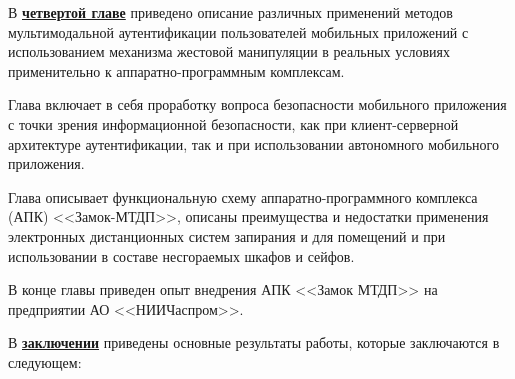 В \underline{\textbf{четвертой главе}} приведено описание различных применений методов  мультимодальной аутентификации пользователей мобильных приложений с использованием механизма жестовой манипуляции в реальных условиях применительно к аппаратно-программным комплексам.

Глава включает в себя проработку вопроса безопасности мобильного приложения с точки зрения информационной безопасности, как при клиент-серверной архитектуре аутентификации, так и при использовании автономного мобильного приложения. 

Глава описывает функциональную схему аппаратно-программного комплекса (АПК) <<Замок-МТДП>>, описаны преимущества и недостатки применения электронных дистанционных систем запирания и для помещений и при использовании в составе несгораемых шкафов и сейфов.  

В конце главы приведен опыт внедрения АПК <<Замок МТДП>> на предприятии АО <<НИИЧаспром>>.

В \underline{\textbf{заключении}} приведены основные результаты работы, которые заключаются в следующем:





